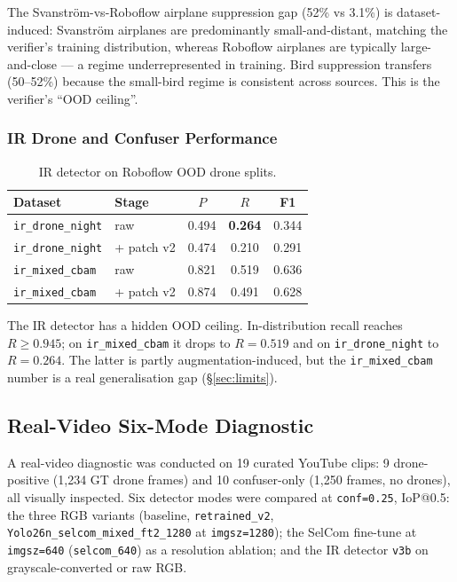 The Svanstr\"om-vs-Roboflow airplane suppression gap (52\% vs 3.1\%) is dataset-induced: Svanstr\"om airplanes are predominantly small-and-distant, matching the verifier's training distribution, whereas Roboflow airplanes are typically large-and-close --- a regime underrepresented in training. Bird suppression transfers (50--52\%) because the small-bird regime is consistent across sources. This is the verifier's ``OOD ceiling''.

\subsubsection{IR Drone and Confuser Performance}

\begin{table}[htbp]
    \centering
    \caption{IR detector on Roboflow OOD drone splits.}
    \label{tab:ood_ir}
    \begin{tabular}{llccc}
        \toprule
        Dataset & Stage & $P$ & $R$ & F1 \\
        \midrule
        \texttt{ir\_drone\_night} & raw & 0.494 & \textbf{0.264} & 0.344 \\
        \texttt{ir\_drone\_night} & + patch v2 & 0.474 & 0.210 & 0.291 \\
        \texttt{ir\_mixed\_cbam}  & raw & 0.821 & 0.519 & 0.636 \\
        \texttt{ir\_mixed\_cbam}  & + patch v2 & 0.874 & 0.491 & 0.628 \\
        \bottomrule
    \end{tabular}
\end{table}

The IR detector has a hidden OOD ceiling. In-distribution recall reaches $R \geq 0.945$; on \texttt{ir\_mixed\_cbam} it drops to $R=0.519$ and on \texttt{ir\_drone\_night} to $R=0.264$. The latter is partly augmentation-induced, but the \texttt{ir\_mixed\_cbam} number is a real generalisation gap (\S\ref{sec:limits}).

\subsection{Real-Video Six-Mode Diagnostic}
\label{sec:realvideo}

A real-video diagnostic was conducted on 19 curated YouTube clips: 9 drone-positive (1{,}234 GT drone frames) and 10 confuser-only (1{,}250 frames, no drones), all visually inspected. Six detector modes were compared at \texttt{conf=0.25}, IoP@0.5: the three RGB variants (baseline, \texttt{retrained\_v2}, \texttt{Yolo26n\_selcom\_mixed\_ft2\_1280} at \texttt{imgsz=1280}); the SelCom fine-tune at \texttt{imgsz=640} (\texttt{selcom\_640}) as a resolution ablation; and the IR detector \texttt{v3b} on grayscale-converted or raw RGB.

